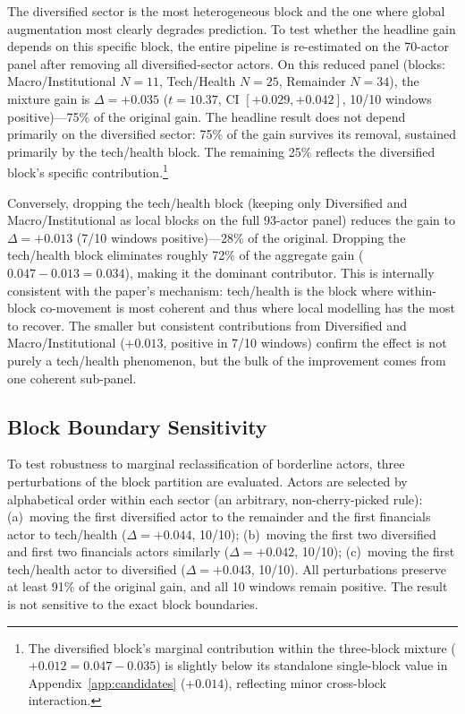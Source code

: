 \documentclass[11pt,a4paper]{article}
\begin{document}
The diversified sector is the most heterogeneous block and the one where global augmentation most clearly degrades prediction. To test whether the headline gain depends on this specific block, the entire pipeline is re-estimated on the 70-actor panel after removing all diversified-sector actors. On this reduced panel (blocks: Macro/Institutional $N{=}11$, Tech/Health $N{=}25$, Remainder $N{=}34$), the mixture gain is $\Delta = +0.035$ ($t = 10.37$, CI $[+0.029, +0.042]$, 10/10 windows positive)---75\% of the original gain. The headline result does not depend primarily on the diversified sector: 75\% of the gain survives its removal, sustained primarily by the tech/health block. The remaining 25\% reflects the diversified block's specific contribution.\footnote{The diversified block's marginal contribution within the three-block mixture ($+0.012 = 0.047 - 0.035$) is slightly below its standalone single-block value in Appendix~\ref{app:candidates} ($+0.014$), reflecting minor cross-block interaction.}

Conversely, dropping the tech/health block (keeping only Diversified and Macro/Institutional as local blocks on the full 93-actor panel) reduces the gain to $\Delta = +0.013$ (7/10 windows positive)---28\% of the original. Dropping the tech/health block eliminates roughly 72\% of the aggregate gain ($0.047 - 0.013 = 0.034$), making it the dominant contributor. This is internally consistent with the paper's mechanism: tech/health is the block where within-block co-movement is most coherent and thus where local modelling has the most to recover. The smaller but consistent contributions from Diversified and Macro/Institutional ($+0.013$, positive in 7/10 windows) confirm the effect is not purely a tech/health phenomenon, but the bulk of the improvement comes from one coherent sub-panel.

\subsection{Block Boundary Sensitivity}

To test robustness to marginal reclassification of borderline actors, three perturbations of the block partition are evaluated. Actors are selected by alphabetical order within each sector (an arbitrary, non-cherry-picked rule): (a)~moving the first diversified actor to the remainder and the first financials actor to tech/health ($\Delta = +0.044$, 10/10); (b)~moving the first two diversified and first two financials actors similarly ($\Delta = +0.042$, 10/10); (c)~moving the first tech/health actor to diversified ($\Delta = +0.043$, 10/10). All perturbations preserve at least 91\% of the original gain, and all 10 windows remain positive. The result is not sensitive to the exact block boundaries.
\end{document}
